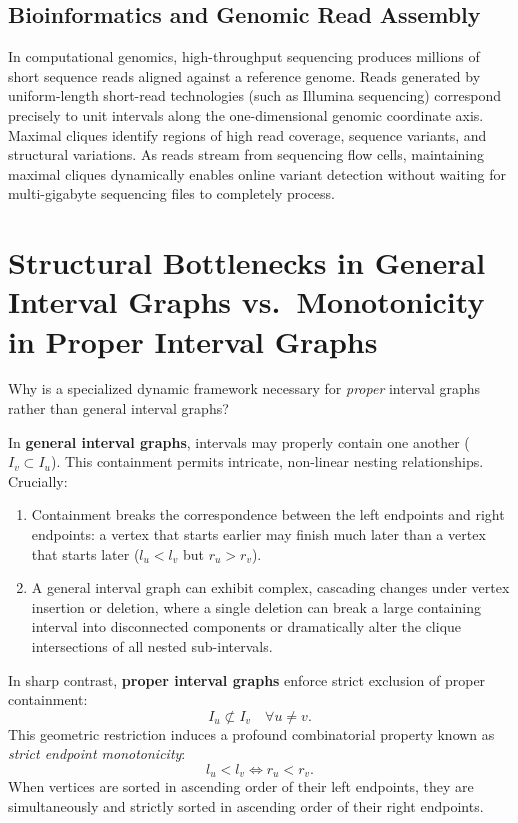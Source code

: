 \subsection{Bioinformatics and Genomic Read Assembly}
In computational genomics, high-throughput sequencing produces millions of short sequence reads aligned against a reference genome. Reads generated by uniform-length short-read technologies (such as Illumina sequencing) correspond precisely to unit intervals along the one-dimensional genomic coordinate axis. Maximal cliques identify regions of high read coverage, sequence variants, and structural variations. As reads stream from sequencing flow cells, maintaining maximal cliques dynamically enables online variant detection without waiting for multi-gigabyte sequencing files to completely process.

\section{Structural Bottlenecks in General Interval Graphs vs.\ Monotonicity in Proper Interval Graphs}
\label{sec:intro_bottlenecks}

Why is a specialized dynamic framework necessary for \emph{proper} interval graphs rather than general interval graphs?

In \textbf{general interval graphs}, intervals may properly contain one another ($I_v \subset I_u$). This containment permits intricate, non-linear nesting relationships. Crucially:
\begin{enumerate}
    \item Containment breaks the correspondence between the left endpoints and right endpoints: a vertex that starts earlier may finish much later than a vertex that starts later ($l_u < l_v$ but $r_u > r_v$).
    \item A general interval graph can exhibit complex, cascading changes under vertex insertion or deletion, where a single deletion can break a large containing interval into disconnected components or dramatically alter the clique intersections of all nested sub-intervals.
\end{enumerate}

In sharp contrast, \textbf{proper interval graphs} enforce strict exclusion of proper containment:
\begin{equation}
    I_u \not\subset I_v \quad \forall u \ne v.
\end{equation}
This geometric restriction induces a profound combinatorial property known as \emph{strict endpoint monotonicity}:
\begin{equation}
    l_u < l_v \iff r_u < r_v.
\end{equation}
When vertices are sorted in ascending order of their left endpoints, they are simultaneously and strictly sorted in ascending order of their right endpoints. 

